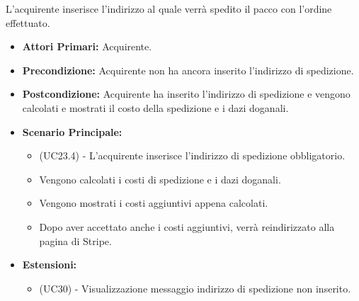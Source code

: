 \resetSubUC

L'acquirente inserisce l'indirizzo al quale verrà spedito il pacco con l'ordine effettuato.
\begin{itemize}
    \item \textbf{Attori Primari:} Acquirente.
    \item \textbf{Precondizione:} Acquirente non ha ancora inserito l'indirizzo di spedizione.
    \item \textbf{Postcondizione:} Acquirente ha inserito l'indirizzo di spedizione e vengono calcolati e mostrati il costo della spedizione e i dazi doganali.
    \item \textbf{Scenario Principale:}
    \begin{itemize}
        \item (UC23.4) - L'acquirente inserisce l'indirizzo di spedizione obbligatorio.
        \item Vengono calcolati i costi di spedizione e i dazi doganali.
        \item Vengono mostrati i costi aggiuntivi appena calcolati.
        \item Dopo aver accettato anche i costi aggiuntivi, verrà reindirizzato alla pagina di Stripe.
    \end{itemize}
    \item \textbf{Estensioni:}
    \begin{itemize}
        \item (UC30) - Visualizzazione messaggio indirizzo di spedizione non inserito.
    \end{itemize}
\end{itemize}

